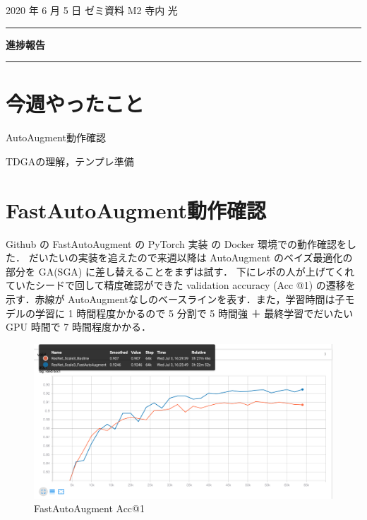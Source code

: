 \documentclass[onecolumn]{ujarticle}   %
\begin{document}
	\noindent

	\hspace{1em}
	2020 年 6 月 5 日
	ゼミ資料
	\hfill
	M2 寺内 光

	\vspace{2mm}

	\hrule

	\begin{center}
		{\Large \bf 進捗報告}
	\end{center}

	\hrule
	\vspace{3mm}

	\section{今週やったこと}
	\begin{itemize}{
		\item{AutoAugment動作確認}
		\item{TDGAの理解，テンプレ準備}
	}\end{itemize}

	\section{FastAutoAugment動作確認}
	Github の FastAutoAugment の PyTorch 実装 \cite{fastautoaugument} の Docker 環境での動作確認をした．
	だいたいの実装を追えたので来週以降は AutoAugment のベイズ最適化の部分を GA(SGA) に差し替えることをまずは試す．
	下にレポの人が上げてくれていたシードで回して精度確認ができた validation accuracy (Acc @1) の遷移を示す．赤線が AutoAugmentなしのベースラインを表す．また，学習時間は子モデルの学習に 1 時間程度かかるので 5 分割で 5 時間強 ＋ 最終学習でだいたい GPU 時間で 7 時間程度かかる．

	\begin{figure}[h]
		\begin{center}
			\includegraphics[width=\columnwidth]{resnet20_valid.png}
			\caption{FastAutoAugment Acc@1}
			\label{fig:FasetAutoAugment-accuracy}
		\end{center}
	\end{figure}
\end{document}
